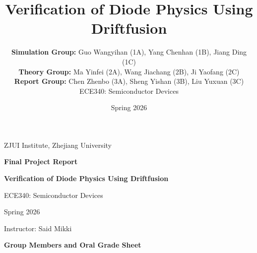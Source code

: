 \documentclass[11pt,a4paper]{article}
\title{Verification of Diode Physics Using Driftfusion}
\author{
    \textbf{Simulation Group:} Guo Wangyihan (1A), Yang Chenhan (1B), Jiang Ding (1C) \\
    \textbf{Theory Group:} Ma Yinfei (2A), Wang Jiachang (2B), Ji Yaofang (2C) \\
    \textbf{Report Group:} Chen Zhenbo (3A), Sheng Yishan (3B), Liu Yuxuan (3C) \\
    ECE340: Semiconductor Devices
}
\date{Spring 2026}
\begin{document}
\begin{titlepage}
    \centering
    \thispagestyle{empty}

    \vspace*{1.0cm}

    {\Large ZJUI Institute, Zhejiang University \par}

    \vspace{1.4cm}

    {\huge \textbf{Final Project Report} \par}

    \vspace{0.8cm}

    {\LARGE \textbf{Verification of Diode Physics Using Driftfusion} \par}

    \vspace{1.0cm}

    {\Large ECE340: Semiconductor Devices \par}
    {\Large Spring 2026 \par}

    \vspace{0.7cm}

    {\large Instructor: Said Mikki \par}

    \vspace{1.2cm}

    {\large \textbf{Group Members and Oral Grade Sheet} \par}

    \vspace{0.4cm}


\end{titlepage}
\end{document}
